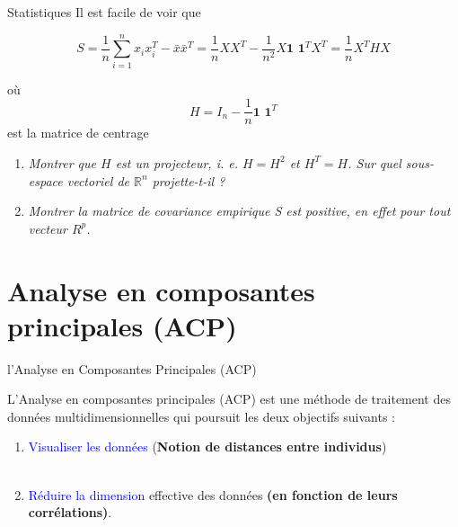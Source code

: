 \documentclass[10pt]{beamer}
\begin{document}
\begin{frame}{Statistiques}
Il est facile de voir que  

$$ S=\frac{1}{n}\sum_{i=1}^nx_ix_i^T-\bar{x}\bar{x}^T=\frac{1}{n}XX^T-\frac{1}{n^2}X\textbf{1 1}^TX^T=\frac{1}{n}X^THX$$  

où $$ H=I_n-\frac{1}{n}\textbf{1 1}^T $$ est la matrice de centrage

\begin{enumerate}
\item \textit{Montrer que $H$ est un projecteur, i. e. $H = H^2$ et $H^T = H$. Sur quel sous-espace vectoriel de $\mathbb{R}^n$ projette-t-il ?}

\item \textit{Montrer la matrice de covariance empirique S est positive, en effet pour tout vecteur $R^p$.}

\end{enumerate}


\end{frame}




\section{Analyse en composantes principales (ACP)}
\begin{frame}{l’Analyse en Composantes Principales (ACP)}

L’Analyse en composantes principales (ACP) est une méthode de traitement des données multidimensionnelles qui poursuit les deux objectifs suivants :

\begin{enumerate}
\item \textcolor{blue}{Visualiser les données} (\textbf{Notion de distances entre individus})\\~\\
\item \textcolor{blue}{Réduire la dimension} effective des données \textbf{(en fonction de leurs corrélations)}.\\~\\
\end{enumerate}



\end{frame}
\end{document}
